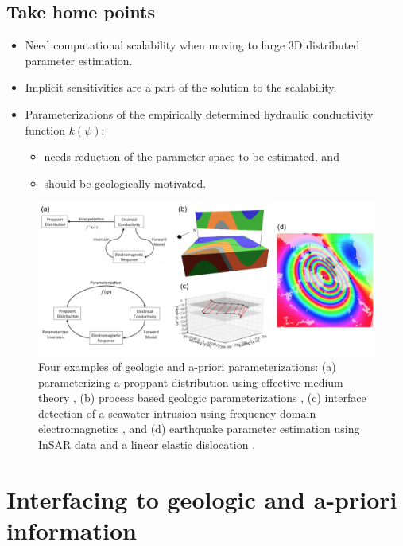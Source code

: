 \documentclass[11pt]{article}
\begin{document}
\subsection{Take home points}

\begin{itemize}
    \item Need computational scalability when moving to large 3D distributed parameter estimation.
    \item Implicit sensitivities are a part of the solution to the scalability.
    \item Parameterizations of the empirically determined hydraulic conductivity function $k(\psi)$:
    \begin{itemize}
        \item needs reduction of the parameter space to be estimated, and
        \item should be geologically motivated.
    \end{itemize}
\end{itemize}


\begin{figure}[ht!]
\centering
\includegraphics[width=16cm]{parameterizations.png}
\caption{Four examples of geologic and a-priori parameterizations: (a) parameterizing a proppant distribution using effective medium theory \citep{HeagySEG2014}, (b) process based geologic parameterizations \citep{Cockett2016}, (c) interface detection of a seawater intrusion using frequency domain electromagnetics \citep{KangSEG2015}, and (d) earthquake parameter estimation using InSAR data and a linear elastic dislocation \citep{Cockett2014b}.}
\label{fig:parameterizations}
\end{figure}

\section{Interfacing to geologic and a-priori information}
\end{document}
